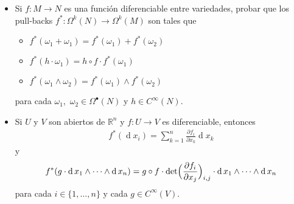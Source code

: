 \documentclass[11pt]{article}
\newcommand{\R}{\mathbb{R}}
\renewcommand{\d}{\operatorname{d}}
\newcommand{\paint}[1]{\color{color}{#1}}
\newenvironment{exercise}[2][Ejercicio]{\begin{trivlist}
\item[\hskip \labelsep \paint{{\bfseries #1}}\hskip \labelsep {\bfseries #2.}]}{\end{trivlist}}
\begin{document}
\begin{exercise}{8} 
\hspace{1pt}
\begin{itemize}[listparindent = \parindent]
\item[a)] Si $f:M\to N$ es una funci\'on diferenciable entre variedades, probar que los pull-backs $f^*:\Omega^k(N)\to\Omega^k(M)$ son tales que
\begin{itemize}[listparindent = \parindent]
\item[(i)] $f^*(\omega_1+\omega_1) = f^*(\omega_1) + f^*(\omega_2)$
\item[(ii)] $f^*(h\cdot \omega_1) = h\circ f\cdot f^*(\omega_1)$ 
\item[(iii)] $f^*(\omega_1\wedge\omega_2) = f^*(\omega_1)\wedge f^*(\omega_2)$
\end{itemize}
para cada $\omega_1$,~$\omega_2\in\Omega^\bullet(N)$ y $h\in C^\infty(N)$.

\item[b)] Si $U$ y $V$ son abiertos de $\R^n$ y $f:U\to V$ es diferenciable,
entonces
\begin{align*}
  f^*(\d x_i)=\sum_{k=1}^n\frac{\partial f_i}{\partial x_k}\d x_k
\end{align*}
y
\begin{align*}
  f^*(g\cdot\d x_1\wedge\cdots\wedge\d x_n)
        = g\circ f
                \cdot\det\Bigl(\frac{\partial f_i}{\partial x_j}\Bigr)_{i,j}
                \cdot \d x_1\wedge 	\cdots\wedge\d x_n
\end{align*}
para cada $i\in\{1,\dots,n\}$ y cada $g\in C^\infty(V)$.
\end{itemize}
\end{exercise}
\end{document}
